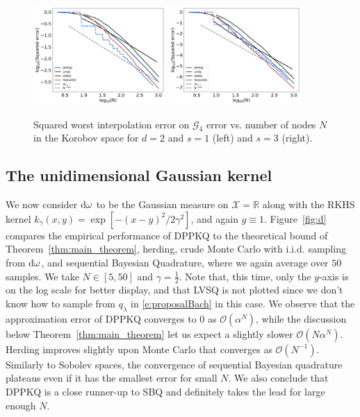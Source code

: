 \documentclass[twoside,11pt]{book}
\numberwithin{theorem}{chapter}
\numberwithin{definition}{chapter}
\numberwithin{proposition}{chapter}
\numberwithin{corollary}{chapter}
\numberwithin{example}{chapter}
\numberwithin{lemma}{chapter}
\numberwithin{assumption}{chapter}
\newcommand{\rb}[1]{\textcolor{magenta}{#1}}
\begin{document}
\begin{figure}
\centering
\includegraphics[width=0.45\textwidth]{img/neurips/multiSobolev/suponunitball_interpolation_Korobov_s_1_binarycubeM_16_fig_1.pdf}
\includegraphics[width=0.45\textwidth]{img/neurips/multiSobolev/suponunitball_interpolation_Korobov_s_2_binarycubeM_16_fig_1.pdf}
\caption{Squared worst interpolation error on $\mathcal{G}_{4}$ error vs. number of nodes $N$ in the Korobov space for $d=2$ and $s = 1$ (left) and $s=3$ (right).
\label{fig:Korobov_DPPKQ_suponunitball_results_G4}}
\end{figure} 




\subsection{The unidimensional Gaussian kernel}\label{s:gaussian_numsim}
We now consider $\rm{d}\omega$ to be the Gaussian measure on $\mathcal{X} = \mathbb{R}$ along with the RKHS kernel $\displaystyle k_{\gamma}(x,y) = \exp[-(x-y)^{2}/2\gamma^{2}]$, and again $g\equiv 1$. Figure~\ref{fig:d} compares the empirical performance of DPPKQ to the theoretical bound of Theorem~\ref{thm:main_theorem}, herding, crude Monte Carlo with i.i.d. sampling from $\rm{d}\omega$, and sequential Bayesian Quadrature, where we again average over $50$ samples.
We take $N \in [5,50]$ and $\gamma = \frac{1}{2}$. Note that, this time, only the $y$-axis is on the log scale for better display, and that LVSQ is not plotted since we don't know how to sample from $q_\lambda$ in \eqref{e:proposalBach} in this case.
%
We observe that the approximation error of DPPKQ converges to $0$ as $\mathcal{O}(\alpha^{N})$, while the discussion below Theorem~\ref{thm:main_theorem} let us expect a slightly slower $\mathcal{O}(N\alpha^{N})$. Herding improves slightly upon Monte Carlo that converges as $\mathcal{O}(N^{-1})$. Similarly to Sobolev spaces, the convergence of sequential Bayesian quadrature plateaus even if it has the smallest error for small $N$.
We also conclude that DPPKQ is a close runner-up to SBQ and definitely takes the lead for large enough $N$.
\end{document}
